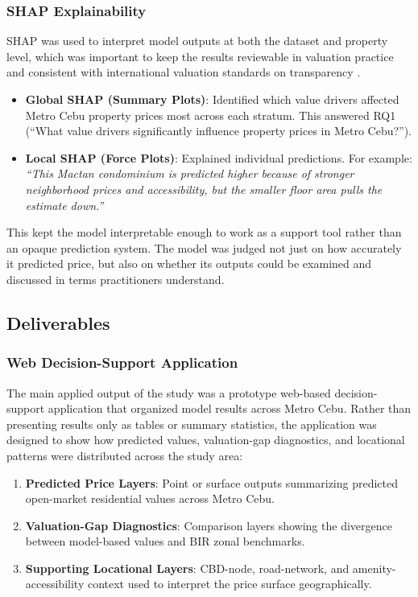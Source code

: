 \subsubsection{SHAP Explainability}\label{shap-explainability}

SHAP was used to interpret model outputs at both the dataset and property level, which was important to keep the results reviewable in valuation practice and consistent with international valuation standards on transparency \parencite{ivs2025}.

\begin{itemize}
\item \textbf{Global SHAP (Summary Plots)}: Identified which value drivers affected Metro Cebu property prices most across each stratum. This answered RQ1 (``What value drivers significantly influence property prices in Metro Cebu?'').
\item \textbf{Local SHAP (Force Plots)}: Explained individual predictions. For example: \emph{``This Mactan condominium is predicted higher because of stronger neighborhood prices and accessibility, but the smaller floor area pulls the estimate down.''}
\end{itemize}

This kept the model interpretable enough to work as a support tool rather than an opaque prediction system. The model was judged not just on how accurately it predicted price, but also on whether its outputs could be examined and discussed in terms practitioners understand.


\subsection{Deliverables}\label{deliverables}

\subsubsection{Web Decision-Support Application}\label{web-application}

The main applied output of the study was a prototype web-based decision-support application that organized model results across Metro Cebu. Rather than presenting results only as tables or summary statistics, the application was designed to show how predicted values, valuation-gap diagnostics, and locational patterns were distributed across the study area:

\begin{enumerate}
\item \textbf{Predicted Price Layers}: Point or surface outputs summarizing predicted open-market residential values across Metro Cebu.
\item \textbf{Valuation-Gap Diagnostics}: Comparison layers showing the divergence between model-based values and BIR zonal benchmarks.
\item \textbf{Supporting Locational Layers}: CBD-node, road-network, and amenity-accessibility context used to interpret the price surface geographically.
\end{enumerate}

